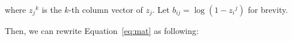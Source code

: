 \documentclass[table]{article}
\begin{document}
where ${z_j}^k$ is the $k$-th column vector of ${z_j}$.
Let $b_{ij} = \log(1-{z_i}^j) $ for brevity.
\begin{comment}
and let ${\bf B_{j}} $ as following :
\begin{equation}\label{eq:v-b}
    {\bf B_j} =
    \begin{pmatrix}
        0 & -\infty & -\infty & \ldots & -\infty \\
        b_{2j}  & 0 & -\infty & \ldots & -\infty\\
        b_{2j} + b_{3j}  & b_{3j} & 0 & \ldots & -\infty\\
        \vdots & \vdots & \vdots & \ddots & \vdots\\
        \sum_{k=2}^T b_{kj} & \sum_{k=3}^T b_{kj} & \sum_{k=4}^T b_{kj} &\ldots & 0
    \end{pmatrix}
\end{equation}
\end{comment}
Then, we can rewrite Equation~\ref{eq:mat} as following:

\begin{comment}
\begin{equation}\label{eq:v-mat}
\begin{pmatrix}
{\bf h}_1^\top \\
{\bf h}_2^\top \\
{\bf h}_3^\top \\
\vdots \\
{\bf h}_T^\top
\end{pmatrix}
 = \left[
 \exp\left\{
 \begin{pmatrix}
    {\bf B_1} \\
    {\bf B_2} \\
    \vdots \\
    {\bf B_d}
 \end{pmatrix}\right\}
\right]
\begin{pmatrix}
{\bf z}_1 \circ \tilde{{\bf h}}^\top_1 \\
{\bf z}_2 \circ \tilde{{\bf h}}^\top_2 \\
{\bf z}_3 \circ \tilde{{\bf h}}^\top_3 \\
\vdots \\
{\bf z}_T \circ \tilde{{\bf h}}^\top_T
\end{pmatrix}
\end{equation}

Here, implicit operation is $3D$-matrix multiplications. It takes a $T$-by-$T$-by-$d$ matrix and a $T$-by-$d$ matrix and takes matrix multiplication of a $T$-by-$T$ matrix and a $T$ vector  in element-wise on $d$ dimension, and has a $T$-by-$d$ matrix as output i.e.

\end{comment}
\end{document}
